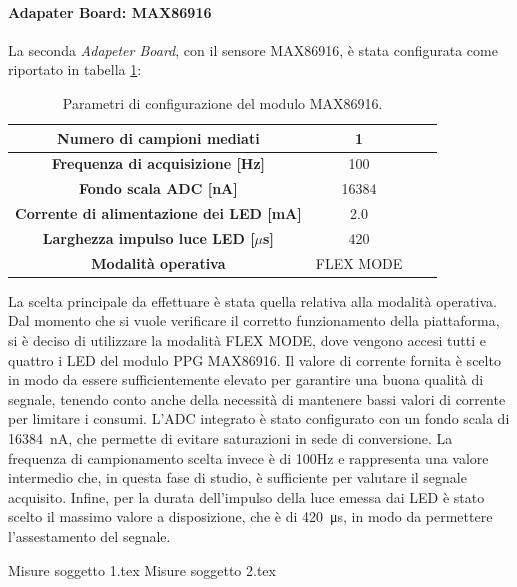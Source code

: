 \paragraph{Adapater Board: MAX86916}
La seconda \textit{Adapeter Board}, con il sensore MAX86916, è stata configurata come riportato in tabella \ref{tab:ConfigMAX86916}:
\begin{table}[h]
	\renewcommand{\arraystretch}{1.5}
	\centering
	\footnotesize
	\begin{tabular}{cccc}
		\textbf{Numero di campioni mediati} & 1 \\ \hline
		\textbf{Frequenza di acquisizione [Hz]} & 100 \\ \hline
		\textbf{Fondo scala ADC [nA]} & 16384 \\ \hline
		\textbf{Corrente di alimentazione dei LED [mA]} & 2.0 \\ \hline
		\textbf{Larghezza impulso luce LED [$\mu$s]} & 420 \\ \hline
		\textbf{Modalità operativa} & FLEX MODE \\ \hline
	\end{tabular}
	\caption{Parametri di configurazione del modulo MAX86916.}
	\label{tab:ConfigMAX86916}
\end{table}
La scelta principale da effettuare è stata quella relativa alla modalità operativa. Dal momento che si vuole verificare il corretto funzionamento della piattaforma, si è deciso di utilizzare la modalità FLEX MODE, dove vengono accesi tutti e quattro i LED del modulo PPG MAX86916. Il valore di corrente fornita è scelto in modo da essere sufficientemente elevato per garantire una buona qualità di segnale, tenendo conto anche della necessità di mantenere bassi valori di corrente per limitare i consumi. L'ADC integrato è stato configurato con un fondo scala di \SI{16384}{\nano\ampere}, che permette di evitare saturazioni in sede di conversione. La frequenza di campionamento scelta invece è di 100Hz e rappresenta una valore intermedio che, in questa fase di studio, è sufficiente per valutare il segnale acquisito. Infine, per la durata dell'impulso della luce emessa dai LED è stato scelto il massimo valore a disposizione, che è di \SI{420}{\micro\second}, in modo da permettere l'assestamento del segnale.

{Misure soggetto 1.tex}
{Misure soggetto 2.tex}